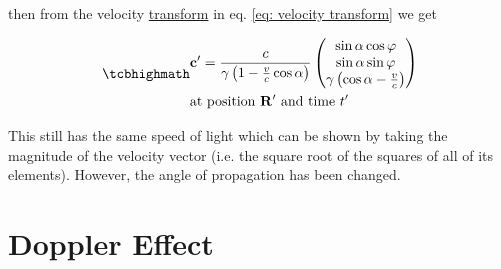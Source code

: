 then from the velocity \hyperlink{def-transform}{transform} in eq. \eqref{eq: velocity transform} we get


\begin{equation}
	\label{eq: velocity transform for light}
	\mhl{
		\begin{aligned}
			 & \mathbf{c}' = \dfrac{c}{{\gamma}\left(1- \frac{v}{c} \cos\alpha\right) }
			\begin{pmatrix}
				\sin\alpha\cos\varphi                            \\
				\sin\alpha\sin\varphi                            \\
				{\gamma} \left( \cos\alpha - \frac{v}{c} \right) \\
			\end{pmatrix}
			\\
			 & \text{at position $\mathbf{R}'$ and time $t'$ }
		\end{aligned}
	}
\end{equation}

This still has the same speed of light which can be shown by taking the magnitude of the velocity vector (i.e. the square root of the squares of all of its elements). However, the angle of propagation has been changed.

\section{Doppler Effect}

